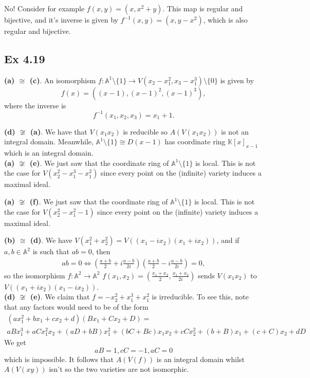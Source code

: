 \documentclass{article}
\theoremstyle{definition}
\newcommand{\K}{\mathbb{K}}
\newcommand{\A}{\mathbb{A}}
\begin{document}
No! Consider for example $f(x, y) = (x, x^{2} + y)$. This map is regular and
bijective, and it's inverse is given by $f^{-1}(x, y) = (x, y - x^{2})$, which
is also regular and bijective.

\subsection*{Ex 4.19} 

\textbf{(a) $\cong$ (c)}. 
An isomorphism $f : \A^{1} \setminus \{1\} \to V(x_2 - x_1^{2}, x_3 - x_1^{3})
\setminus \{0\}$ is given by
\[
	f(x)
	=
	\left((x - 1), (x - 1)^{2}, (x - 1)^{3}\right),
\] 
where the inverse is
\[
	f^{-1}(x_1, x_2, x_3)
	=
	x_1 + 1.
\] 

\textbf{(d) $\not \cong$ (a)}. 
We have that $V(x_1x_2)$ is reducible so $A(V(x_1x_2))$ is not an integral
domain. Meanwhile, $\A^{1} \setminus \{1\} \cong D(x - 1)$ has coordinate ring
$\K[x]_{x - 1}$ which is an integral domain. \\

\textbf{(a) $\not \cong$ (e)}. 
We just saw that the coordinate ring of $\A^{1} \setminus \{1\}$
is local. This is not the case for $V(x_2^{2} - x_1^{3} - x_1^{2})$
since every point on the (infinite) variety induces a maximal ideal.

\textbf{(a) $\not \cong$ (f)}. 
We just saw that the coordinate ring of $\A^{1} \setminus \{1\}$ is local. This
is not the case for $V(x_2^{2} - x_1^{2} - 1)$ since every point on the
(infinite) variety induces a maximal ideal.

\textbf{(b) $\cong$ (d)}. 
We have $V(x_1^{2} + x_2^{2}) = V((x_1 - ix_2)(x_1 + ix_2))$, and if $a, b \in \A^{2}$
is such that $ab = 0$, then
\begin{align*}
	ab = 0
	\Leftrightarrow
	\left(\frac{a + b}{2} + i \frac{a - b}{2i}\right)
	\left(\frac{a + b}{2} - i \frac{a - b}{2i}\right) 
	= 0,
\end{align*}
so the isomorphism $f : \A^{2} \to \A^{2}$ $f(x_1, x_2) = \left(\frac{x_1 +
x_2}{2}, \frac{x_1 + x_2}{2i}\right)$ sends $V(x_1x_2)$ to $V((x_1 + ix_2)(x_1
- ix_2))$. \\

\textbf{(d) $\not \cong$ (e)}. 
We claim that $f = -x_2^{2} + x_1^{3} + x_1^{2}$ is irreducible. To see this,
note that any factors would need to be of the form
\begin{align*}
	(ax_1^{2} + bx_1 + cx_2 + d)
	(Bx_1 + Cx_2 + D)
	= \\
	aB x_1^{3} 
	+ 
	aC x_1^{2}x_2 
	+
	(aD + bB) x_1^{2}
	+
	(bC + Bc) x_1 x_2
	+
	cC x_2^{2}
	+
	(b + B) x_1
	+
	(c + C) x_2
	+ 
	dD
\end{align*} 
We get
\[
	aB = 1, cC = -1, aC = 0
\] 
which is impossible. It follows that $A(V(f))$ is an integral domain whilst
$A(V(xy))$ isn't so the two varieties are not isomorphic. \\
\end{document}
